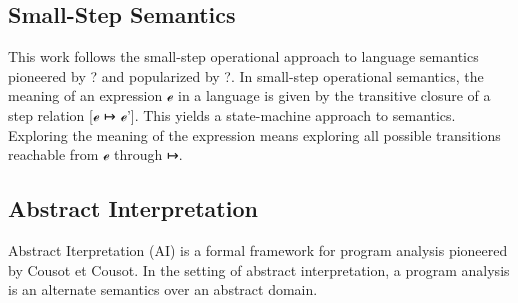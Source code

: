 \documentclass{article}
\begin{document}

\subsection{Small-Step Semantics}
\label{section:Background:SmallStepSemantics}

This work follows the small-step operational approach to language semantics pioneered by ? and popularized by ?.
%
In small-step operational semantics, the meaning of an expression ℯ in a language is given by the transitive closure of a step relation [ℯ ↦ ℯ'].
%
This yields a state-machine approach to semantics.
%
Exploring the meaning of the expression means exploring all possible transitions reachable from ℯ through ↦.


\subsection{Abstract Interpretation}
\label{section:Background:AbstractInterpretation}

Abstract Iterpretation (AI) is a formal framework for program analysis pioneered by Cousot et Cousot.
%
In the setting of abstract interpretation, a program analysis is an alternate semantics over an abstract domain.
\end{document}
